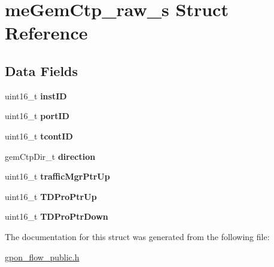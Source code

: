 \hypertarget{structmeGemCtp__raw__s}{}\section{me\+Gem\+Ctp\+\_\+raw\+\_\+s Struct Reference}
\label{structmeGemCtp__raw__s}
\subsection*{Data Fields}
\begin{DoxyCompactItemize}
\item 
\mbox{\label{structmeGemCtp__raw__s_a0e8cee59704cdc237c33408a9b5fa8a5}} 
uint16\+\_\+t {\bfseries inst\+ID}
\item 
\mbox{\label{structmeGemCtp__raw__s_a74f94c49e788ce9e98c16238ffd5b0b2}} 
uint16\+\_\+t {\bfseries port\+ID}
\item 
\mbox{\label{structmeGemCtp__raw__s_ab43016869b6f2b1424aac07427a31417}} 
uint16\+\_\+t {\bfseries tcont\+ID}
\item 
\mbox{\label{structmeGemCtp__raw__s_a85b7293a65d9bdf8428b46e386c0e764}} 
gem\+Ctp\+Dir\+\_\+t {\bfseries direction}
\item 
\mbox{\label{structmeGemCtp__raw__s_ad3cf970257b002a07ef9e1b50fc12d18}} 
uint16\+\_\+t {\bfseries traffic\+Mgr\+Ptr\+Up}
\item 
\mbox{\label{structmeGemCtp__raw__s_add30a3db4d3d638a8b6b02cca42f9045}} 
uint16\+\_\+t {\bfseries T\+D\+Pro\+Ptr\+Up}
\item 
\mbox{\label{structmeGemCtp__raw__s_a2cd6ec23d750560f5b02ed53f15f93fb}} 
uint16\+\_\+t {\bfseries T\+D\+Pro\+Ptr\+Down}
\end{DoxyCompactItemize}


The documentation for this struct was generated from the following file\+:\begin{DoxyCompactItemize}
\item 
\hyperlink{gpon__flow__public_8h}{gpon\+\_\+flow\+\_\+public.\+h}\end{DoxyCompactItemize}
